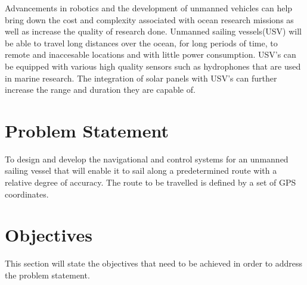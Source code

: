 Advancements in robotics and the development of unmanned vehicles can help bring down the cost and complexity associated with ocean research missions 
as well as increase the quality of research done. Unmanned sailing vessels(USV) will be able to travel long distances over the ocean, for long periods of 
time, to remote and inaccesable locations and with little power consumption. USV's can be equipped with various high quality sensors 
such as hydrophones that are used in marine research. The integration of solar panels with USV's can further increase the range and 
duration they are capable of.

\section{Problem Statement}
\label{problem_statement}
To design and develop the navigational and control systems for an unmanned sailing vessel that will enable it to sail along a predetermined route with a 
relative degree of accuracy. The route to be travelled is defined by a set of GPS coordinates. 

\section{Objectives}
This section will state the objectives that need to be achieved in order to address the problem statement.




